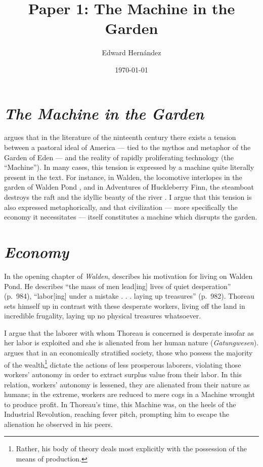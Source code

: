 \documentclass[man,12pt,natbib]{apa6}
\begin{document}
\title{Paper 1: The Machine in the Garden}
\author{Edward Hern\'{a}ndez}
\date{\today}
\maketitle

\section{\emph{The Machine in the Garden}}

\citet{Marx64} argues that in the literature of the ninteenth century there
exists a tension between a pastoral ideal of America --- tied to the mythos and
metaphor of the Garden of Eden --- and the reality of rapidly proliferating
technology (the ``Machine''). In many cases, this tension is expressed by a
machine quite literally present in the text. For instance, in Walden, the
locomotive interlopes in the garden of Walden Pond \citep[ch.~4]{Thoreau12},
and in Adventures of Huckleberry Finn, the steamboat destroys the raft and the
idyllic beauty of the river \citep[ch.~16]{Twain85}.  I argue that this tension
is also expressed metaphorically, and that civilization --- more specifically
the economy it necessitates --- itself constitutes a machine which disrupts the
garden.


\section{\emph{Economy}}

In the opening chapter of \emph{Walden}, \citet{Thoreau12} describes his
motivation for living on Walden Pond. He describes ``the mass of men lead[ing]
lives of quiet desperation'' (p.~984), ``labor[ing] under a mistake . . .
laying up treasures'' (p.~982).
Thoreau sets himself up in contrast with these desperate workers, living off
the land in incredible frugality, laying up no physical treasures whatsoever.

I argue that the laborer with whom Thoreau is concerned is desperate insofar as
her labor is exploited and she is alienated from her human nature
(\emph{Gatungwesen}). \citet{Marx44} argues that in an economically stratified
society, those who possess the majority of the wealth\footnote{Rather, his body
of theory deals most explicitly with the possession of the means of
production.} dictate the actions of less prosperous laborers, violating those
workers' autonomy in order to extract surplus value from their labor. In this
relation, workers' autonomy is lessened, they are alienated from their nature
as humans; in the extreme, workers are reduced to mere cogs in a Machine
wrought to produce profit. In Thoreau's time, this Machine was, on the heels of
the Industrial Revolution, reaching fever pitch, prompting him to escape the
alienation he observed in his peers.
\end{document}

